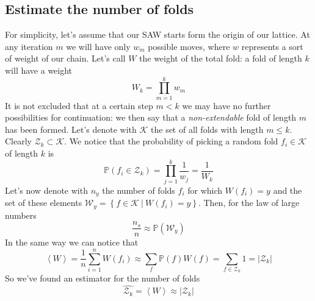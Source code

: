 \subsection{Estimate the number of folds}
For simplicity, let's assume that our SAW starts form the origin of our lattice.
At any iteration $m$ we will have only $w_m$ possible moves, where $w$ represents a sort of weight of our chain.
Let's call $W$ the weight of the total fold: a fold of length $k$ will have a weight
\begin{equation*}
    W_k = \prod_{m=1}^k w_m
\end{equation*}
It is not excluded that at a certain step $m < k$ we may have no further possibilities for continuation: we then say that a \emph{non-extendable} fold of length $m$ has been formed.
Let's denote with $\mathcal{K}$ the set of all folds with length $m \leq k$.
Clearly $\mathcal{Z}_k \subset \mathcal{K}$.
We notice that the probability of picking a random fold $f_i \in \mathcal{K}$ of length $k$ is
\begin{equation*}
    \mathbb{P}\left(f_i \in \mathcal{Z}_k\right) = \prod_{j=1}^k \frac{1}{w_j} = \frac{1}{W_k}
\end{equation*}
Let's now denote with $n_y$ the number of folds $f_i$ for which $W\left(f_i\right) = y$ and the set of these elements $\mathcal{W}_y = \left\{f \in \mathcal{K} \ | \ W\left(f_i\right) = y\right\}$.
Then, for the law of large numbers
\begin{equation*}
    \frac{n_s}{n} \approx \mathbb{P}\left(\mathcal{W}_y\right)
\end{equation*}
In the same way we can notice that
\begin{equation*}
    \left\langle W \right\rangle = \frac{1}{n} \sum_{i=1}^n W\left(f_i\right) \approx \sum_f \mathbb{P}\left(f\right)W\left(f\right) = \sum_{f \in \mathcal{Z}_k} 1 = \left\lvert \mathcal{Z}_k \right\rvert
\end{equation*}
So we've found an estimator for the number of folds
\begin{equation}
    \hat{\mathcal{Z}_k} = \left\langle W \right\rangle \approx \left\lvert \mathcal{Z}_k \right\rvert
\end{equation}